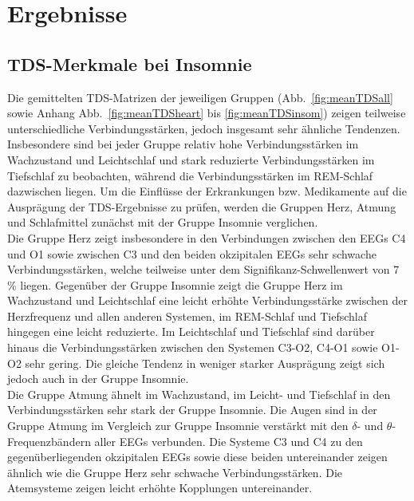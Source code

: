 \chapter{Ergebnisse}

\section{TDS-Merkmale bei Insomnie}

Die gemittelten \acs{TDS}-Matrizen der jeweiligen Gruppen (Abb.~\ref{fig:meanTDSall} sowie Anhang Abb.~\ref{fig:meanTDSheart} bis \ref{fig:meanTDSinsom}) zeigen teilweise unterschiedliche Verbindungsstärken, jedoch insgesamt sehr ähnliche Tendenzen. Insbesondere sind bei jeder Gruppe relativ hohe Verbindungsstärken im Wachzustand und Leichtschlaf und stark reduzierte Verbindungsstärken im Tiefschlaf zu beobachten, während die Verbindungsstärken im \acs{REM}-Schlaf dazwischen liegen. Um die Einflüsse der Erkrankungen bzw. Medikamente auf die Ausprägung der \acs{TDS}-Ergebnisse zu prüfen, werden die Gruppen Herz, Atmung und Schlafmittel zunächst mit der Gruppe Insomnie verglichen.\\

Die Gruppe Herz zeigt insbesondere in den Verbindungen zwischen den \acs{EEG}s C4 und O1 sowie zwischen C3 und den beiden okzipitalen \acs{EEG}s sehr schwache Verbindungsstärken, welche teilweise unter dem Signifikanz-Schwellenwert von 7 \% liegen. Gegenüber der Gruppe Insomnie zeigt die Gruppe Herz im Wachzustand und Leichtschlaf eine leicht erhöhte Verbindungsstärke zwischen der Herzfrequenz und allen anderen Systemen, im \acs{REM}-Schlaf und Tiefschlaf hingegen eine leicht reduzierte. Im Leichtschlaf und Tiefschlaf sind darüber hinaus die Verbindungsstärken zwischen den Systemen C3-O2, C4-O1 sowie O1-O2 sehr gering. Die gleiche Tendenz in weniger starker Ausprägung zeigt sich jedoch auch in der Gruppe Insomnie.\\

Die Gruppe Atmung ähnelt im Wachzustand, im Leicht- und Tiefschlaf in den Verbindungsstärken sehr stark der Gruppe Insomnie. Die Augen sind in der Gruppe Atmung im Vergleich zur Gruppe Insomnie verstärkt mit den $\delta$- und $\theta$-Frequenzbändern aller \acs{EEG}s verbunden. Die Systeme C3 und C4 zu den gegenüberliegenden okzipitalen \acs{EEG}s sowie diese beiden untereinander zeigen ähnlich wie die Gruppe Herz sehr schwache Verbindungsstärken. Die Atemsysteme zeigen leicht erhöhte Kopplungen untereinander.\\

